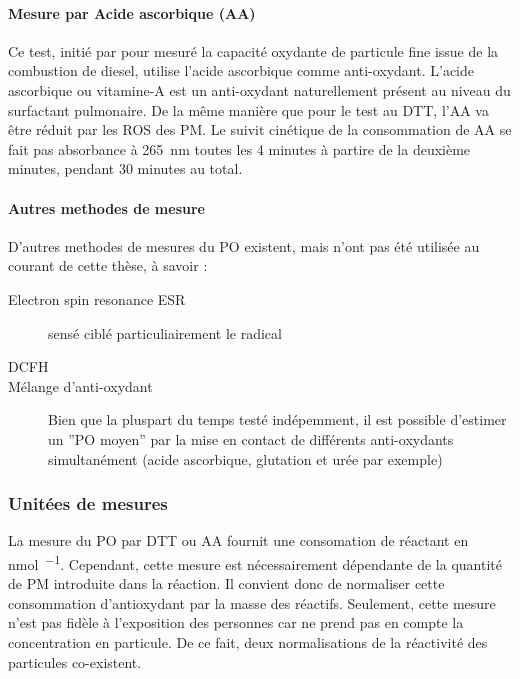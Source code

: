 \paragraph{Mesure par Acide ascorbique (AA)}%
\label{ssub:mesure_par_acide_ascorbique}

Ce test, initié par \textcite{zielinskiModeling1999} pour mesuré la capacité oxydante de
particule fine issue de la combustion de diesel, utilise l'acide ascorbique comme
anti-oxydant.
L'acide ascorbique ou vitamine-A est un anti-oxydant naturellement présent au niveau du
surfactant pulmonaire. De la même manière que pour le test au DTT, l'AA va être réduit par
les ROS des PM.
Le suivit cinétique de la consommation de AA se fait pas absorbance à \SI{265}{\nano\m}
toutes les 4 minutes à partire de la deuxième minutes, pendant 30 minutes au total.


\paragraph{Autres methodes de mesure}%
\label{sub:autres_methodes_de_mesure}

D'autres methodes de mesures du PO existent, mais n'ont pas été utilisée au courant de
cette thèse, à savoir :
\begin{description}
    \item[Electron spin resonance ESR] sensé ciblé particuliairement le radical
         \autocite{shiHydroxyl2003,shiTemporal2003}
    \item[DCFH]
    \item[Mélange d'anti-oxydant] Bien que la pluspart du temps testé indépemment, il est
        possible d'estimer un ''PO moyen'' par la mise en contact de différents
        anti-oxydants simultanément (acide ascorbique, glutation et urée par exemple)~\autocite{calasComparison2018}
\end{description}

\subsubsection{Unitées de mesures}%
\label{ssub:unitees_de_mesures}

La mesure du PO par DTT ou AA fournit une consomation de réactant en \si{\nano\mole\per\min}.
Cependant, cette mesure est nécessairement dépendante de la quantité de PM introduite dans
la réaction.
Il convient donc de normaliser cette consommation d'antioxydant par la masse des réactifs.
Seulement, cette mesure n'est pas fidèle à l'exposition des personnes car ne prend pas en
compte la concentration en particule. De ce fait, deux normalisations de la réactivité des
particules co-existent.

